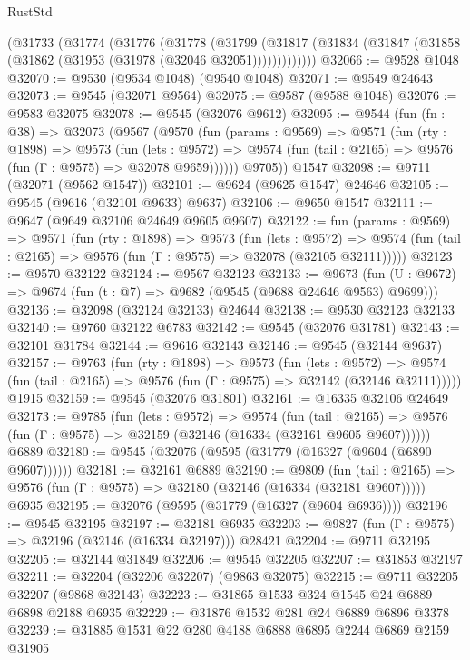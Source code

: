 \begin{lexlean}{RustStd}
\begin{coremodule}
    (@31733
      (@31774
        (@31776
          (@31778
            (@31799
              (@31817 (@31834 (@31847 (@31858 (@31862 (@31953 (@31978 (@32046 @32051)))))))))))))
@32066 := @9528 @1048
@32070 := @9530 (@9534 @1048) (@9540 @1048)
@32071 := @9549 @24643
@32073 := @9545 (@32071 @9564)
@32075 := @9587 (@9588 @1048)
@32076 := @9583 @32075
@32078 := @9545 (@32076 @9612)
@32095 := @9544
    (fun (fn : @38) =>
    @32073
      (@9567
        (@9570
          (fun (params : @9569) =>
          @9571
            (fun (rty : @1898) =>
            @9573
              (fun (lets : @9572) =>
              @9574 (fun (tail : @2165) => @9576 (fun (Γ : @9575) => @32078 @9659))))))
        @9705))
    @1547
@32098 := @9711 (@32071 (@9562 @1547))
@32101 := @9624 (@9625 @1547) @24646
@32105 := @9545 (@9616 (@32101 @9633) @9637)
@32106 := @9650 @1547
@32111 := @9647 (@9649 @32106 @24649 @9605 @9607)
@32122 := fun (params : @9569) =>
  @9571
    (fun (rty : @1898) =>
    @9573
      (fun (lets : @9572) =>
      @9574 (fun (tail : @2165) => @9576 (fun (Γ : @9575) => @32078 (@32105 @32111)))))
@32123 := @9570 @32122
@32124 := @9567 @32123
@32133 := @9673
    (fun (U : @9672) => @9674 (fun (t : @7) => @9682 (@9545 (@9688 @24646 @9563) @9699)))
@32136 := @32098 (@32124 @32133) @24644
@32138 := @9530 @32123 @32133
@32140 := @9760 @32122 @6783
@32142 := @9545 (@32076 @31781)
@32143 := @32101 @31784
@32144 := @9616 @32143
@32146 := @9545 (@32144 @9637)
@32157 := @9763
    (fun (rty : @1898) =>
    @9573
      (fun (lets : @9572) =>
      @9574 (fun (tail : @2165) => @9576 (fun (Γ : @9575) => @32142 (@32146 @32111)))))
    @1915
@32159 := @9545 (@32076 @31801)
@32161 := @16335 @32106 @24649
@32173 := @9785
    (fun (lets : @9572) =>
    @9574
      (fun (tail : @2165) =>
      @9576 (fun (Γ : @9575) => @32159 (@32146 (@16334 (@32161 @9605 @9607))))))
    @6889
@32180 := @9545 (@32076 (@9595 (@31779 (@16327 (@9604 (@6890 @9607))))))
@32181 := @32161 @6889
@32190 := @9809
    (fun (tail : @2165) => @9576 (fun (Γ : @9575) => @32180 (@32146 (@16334 (@32181 @9607)))))
    @6935
@32195 := @32076 (@9595 (@31779 (@16327 (@9604 @6936))))
@32196 := @9545 @32195
@32197 := @32181 @6935
@32203 := @9827 (fun (Γ : @9575) => @32196 (@32146 (@16334 @32197))) @28421
@32204 := @9711 @32195
@32205 := @32144 @31849
@32206 := @9545 @32205
@32207 := @31853 @32197
@32211 := @32204 (@32206 @32207) (@9863 @32075)
@32215 := @9711 @32205 @32207 (@9868 @32143)
@32223 := @31865 @1533 @324 @1545 @24 @6889 @6898 @2188 @6935
@32229 := @31876 @1532 @281 @24 @6889 @6896 @3378
@32239 := @31885 @1531 @22 @280 @4188 @6888 @6895 @2244 @6869 @2159 @31905

\end{coremodule}
\end{lexlean}
